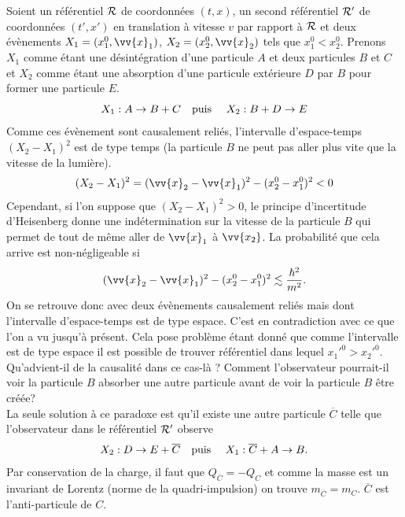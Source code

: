 \documentclass[a4paper,11pt]{report}
\begin{document}
            Soient un référentiel $\mathcal{R}$ de coordonnées $(t,x)$, un second référentiel $\mathcal{R}'$ de coordonnées $(t',x')$ en translation à vitesse $v$ par rapport à $\mathcal{R}$ et deux évènements $X_1 = (x_1^0,\vv{x}_1)$, $X_2 = (x_2^0,\vv{x}_2)$ tels que $x_1^0<x_2^0$. Prenons $X_1$ comme étant une désintégration d'une particule $A$ et deux particules $B$ et $C$ et $X_2$ comme étant une absorption d'une particule extérieure $D$ par $B$ pour former une particule $E$.
            \begin{equation}
                X_1 : A\to B+C \text{\quad puis \quad} X_2 : B+D\to E
            \end{equation}
            Comme ces évènement sont causalement reliés, l'intervalle d'espace-temps $(X_2-X_1)^2$ est de type temps (la particule $B$ ne peut pas aller plus vite que la vitesse de la lumière).
            \begin{equation}
                (X_2-X_1)^2 = (\vv{x}_2-\vv{x}_1)^2 - (x_2^0-x_1^0)^2 < 0
            \end{equation}
            Cependant, si l'on suppose que $(X_2-X_1)^2 > 0$, le principe d'incertitude d'Heisenberg donne une indétermination sur la vitesse de la particule $B$ qui permet de tout de même aller de $\vv{x}_1$ à $\vv{x_2}$. La probabilité que cela arrive est non-négligeable si
            \begin{equation}
                (\vv{x}_2-\vv{x}_1)^2 - (x_2^0-x_1^0)^2 \lesssim \frac{\hbar^2}{m^2}.
            \end{equation}
            On se retrouve donc avec deux évènements causalement reliés mais dont l'intervalle d'espace-temps est de type espace. C'est en contradiction avec ce que l'on a vu jusqu'à présent. Cela pose problème étant donné que comme l'intervalle est de type espace il est possible de trouver référentiel dans lequel $x_1'^0 > x_2'^0$. Qu'advient-il de la causalité dans ce cas-là ? Comment l'observateur pourrait-il voir la particule $B$ absorber une autre particule avant de voir la particule $B$ être créée?\\
            
            La seule solution à ce paradoxe est qu'il existe une autre particule $\overline{C}$ telle que l'observateur dans le référentiel $\mathcal{R}'$ observe
            \begin{equation}
                X_2 : D\to E+\overline{C} \text{\quad puis \quad} X_1 : \overline{C}+A\to B.
            \end{equation}
            Par conservation de la charge, il faut que $Q_{\overline{C}} = -Q_C$ et comme la masse est un invariant de Lorentz (norme de la quadri-impulsion) on trouve $m_{\overline{C}} = m_C$. $\overline{C}$ est l'anti-particule de $C$.\\
            
\end{document}

